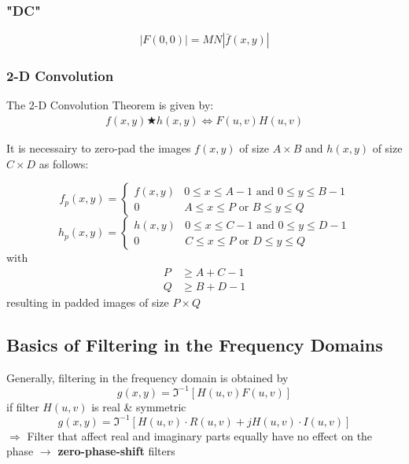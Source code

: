 \subsubsection{"DC"}
  \begin{equation}
    |F(0,0)| = MN|\bar{f}(x,y)|
  \end{equation}

\subsubsection{2-D Convolution }
The 2-D Convolution Theorem is given by:
\begin{align}
	f(x,y) \bigstar h(x,y) \Leftrightarrow F(u,v)H(u,v)
\end{align}

It is necessairy to zero-pad the images $f(x,y)$ of size $A \times B$ and $h(x,y)$ of size $C \times D$ as follows:

\begin{equation}
	f_p(x,y) = 
		\begin{cases} 
			f(x,y) & 0 \leq x \leq A-1 \text{  and  } 0 \leq y \leq B-1 \\
			0 & A \leq x \leq P \text{  or  } B \leq y \leq Q
		\end{cases}
\end{equation}
\begin{equation}
	h_p(x,y) = 
		\begin{cases}
			h(x,y) & 0 \leq x \leq C-1 \text{  and  } 0 \leq y \leq D-1 \\
			0 & C \leq x \leq P \text{  or  } D \leq y \leq Q
		\end{cases}
\end{equation}
with
\begin{align}
	P &\geq A+C-1 \\
	Q &\geq B+D-1
	\label{equ:2D_Conv_Padding}
\end{align}
resulting in padded images of size $P \times Q$

\subsection{Basics of Filtering in the Frequency Domains}
  Generally, filtering in the frequency domain is obtained by
  \begin{equation}
  g(x,y) = \Im^{-1} \left[ H(u,v) F(u,v) \right]
  \end{equation}
  if filter $H(u,v)$ is real \& symmetric
  \begin{equation}
  g(x,y) = \Im^{-1} \left[ H(u,v) \cdot R(u,v) + j H(u,v) \cdot I(u,v)\right]
  \end{equation}  
  $\Rightarrow$ Filter that affect real and imaginary parts equally have no effect on the phase $\rightarrow$ \textbf{zero-phase-shift} filters 

